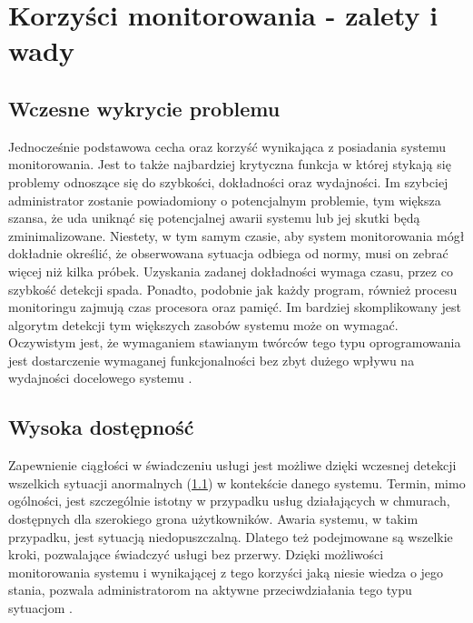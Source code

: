 \section{Korzyści monitorowania - zalety i wady}
\label{chapter:monitoring:advantages}

    \subsection{Wczesne wykrycie problemu}
    \label{chapter:monitoring:advantages:early_detection}
    Jednocześnie podstawowa cecha oraz korzyść wynikająca z posiadania systemu monitorowania. 
    Jest to także najbardziej krytyczna funkcja w której stykają się problemy odnoszące się
    do szybkości, dokładności oraz wydajności. Im szybciej administrator zostanie
    powiadomiony o potencjalnym problemie, tym większa szansa, że uda uniknąć się potencjalnej
    awarii systemu lub jej skutki będą zminimalizowane. Niestety, w tym samym czasie, 
    aby system monitorowania mógł dokładnie określić, że obserwowana sytuacja odbiega od normy,
    musi on zebrać więcej niż kilka próbek. Uzyskania zadanej dokładności wymaga czasu, 
    przez co szybkość detekcji spada. Ponadto, podobnie jak każdy program, również procesu
    monitoringu zajmują czas procesora oraz pamięć. Im bardziej skomplikowany jest algorytm
    detekcji tym większych zasobów systemu może on wymagać. Oczywistym jest, że wymaganiem
    stawianym twórców tego typu oprogramowania jest dostarczenie wymaganej funkcjonalności
    bez zbyt dużego wpływu na wydajności docelowego systemu \cite{monitoring_and_alerting}. 
    
    \subsection{Wysoka dostępność}
    \label{chapter:monitoring:advantages:high_availability}
    Zapewnienie ciągłości w świadczeniu usługi jest możliwe dzięki wczesnej detekcji
    wszelkich sytuacji anormalnych (\ref{chapter:monitoring:advantages:early_detection}) w kontekście danego systemu. 
    Termin, mimo ogólności, jest szczególnie istotny w przypadku usług działających w chmurach, dostępnych
    dla szerokiego grona użytkowników. Awaria systemu, w takim przypadku, jest sytuacją niedopuszczalną. Dlatego
    też podejmowane są wszelkie kroki, pozwalające świadczyć usługi bez przerwy. Dzięki możliwości
    monitorowania systemu i wynikającej z tego korzyści jaką niesie wiedza o jego stania, pozwala
    administratorom na aktywne przeciwdziałania tego typu sytuacjom \cite{monitoring_and_alerting}. 
    
